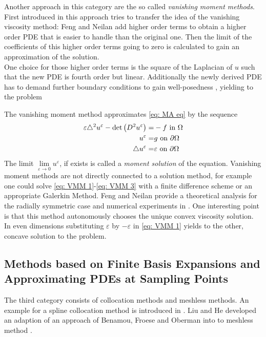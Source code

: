 Another approach in this category are the so called \emph{vanishing moment methods}. First introduced in \cite{FN2009} this approach tries to transfer the idea of the vanishing viscosity method: Feng and Neilan add higher order terms to obtain a higher order PDE that is easier to handle than the original one. Then the limit of the coefficients of this higher order terms going to zero is calculated to gain an approximation of the \MA solution. \\
One choice for those higher order terms is the square of the Laplacian of $u$ such that the new PDE is fourth order but linear. Additionally the newly derived PDE has to demand further boundary conditions to gain well-posedness , yielding to the problem
\begin{definition}
	The vanishing moment method approximates \eqref{eq: MA eq} by the sequence
	\begin{align}
		\varepsilon \triangle^2 u^\varepsilon - \det{\left(D^2 u^\varepsilon\right)} =& -f \text{ in } \Omega \label{eq: VMM 1}\\ 
		u^\varepsilon =& g \text{ on } \partial \Omega \label{eq: VMM 2}\\
		\triangle u^\varepsilon = & \varepsilon \text{ on } \partial \Omega \label{eq: VMM 3}
	\end{align}
The limit $\lim\limits_{\varepsilon \rightarrow 0 } u^\varepsilon$, if exists is called a \emph{moment solution} of the \MA equation.
Vanishing moment methods are not directly connected to a solution method, for example one could solve \eqref{eq: VMM 1}-\eqref{eq: VMM 3} with a finite difference scheme or an appropriate Galerkin Method.
Feng and Neilan provide a theoretical analysis for the radially symmetric case and numerical experiments in \cite{FN2009, Neilan2010, FN2011a}. One interesting point is that this method autonomously chooses the unique convex viscosity solution. In even dimensions substituting $\varepsilon$ by $-\varepsilon$ in  \eqref{eq: VMM 1} yields to the other, concave solution to the \MA problem.  
\end{definition}


\subsection{Methods based on Finite Basis Expansions and Approximating PDEs at Sampling Points}
The third category consists of collocation methods and meshless methods.
An example for a spline collocation method is introduced in \cite{BHP2014}. 
Liu and He developed an adaption of an approach of Benamou, Froese and Oberman into to meshless method \cite{LH2013}.
